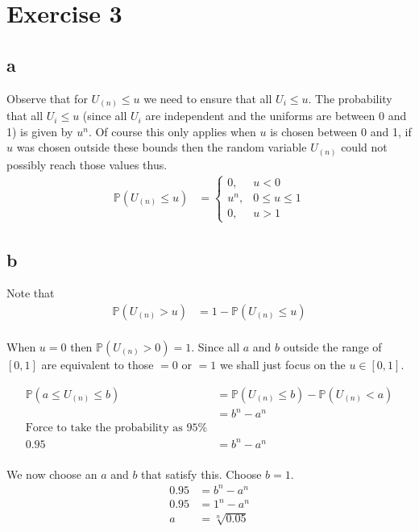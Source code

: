 \documentclass{article}
\newcommand{\prob}{\mathbb{P}}
\begin{document}
\section{Exercise 3}
\subsection{a}
Observe that for $U_{(n)} \leq u$ we need to ensure that all $U_i \leq u$.
The probability that all $U_i \leq u$ (since all $U_i$ are independent and the
uniforms are between 0 and 1) is given by $u^n$. Of course this only applies
when $u$ is chosen between 0 and 1, if $u$ was chosen outside these bounds then
the random variable $U_{(n)}$ could not possibly reach those values thus.
\begin{align*}
    \prob(U_{(n)} \leq u)
    &=
    \begin{cases}
        0, & u < 0 \\
        u^n, & 0 \leq u \leq 1 \\
        0, & u > 1
    \end{cases}
\end{align*}

\subsection{b}
Note that
\begin{align*}
    \prob(U_{(n)} > u) &= 1 - \prob(U_{(n)} \leq u) \\
\end{align*}

When $u = 0$ then $\prob(U_{(n)} > 0) = 1$. Since all $a$ and $b$ outside the
range of $[0,1]$ are equivalent to those $=0$ or $=1$ we shall just focus on the
$u \in [0,1]$.

\begin{align*}
    \prob(a \leq U_{(n)} \leq b) &= \prob(U_{(n)} \leq b) - \prob(U_{(n)} < a) \\
    &= b^n - a^n \\
    \text{Force to take the probability as 95\%} \\
    0.95 &= b^n - a^n \\
\end{align*}

We now choose an $a$ and $b$ that satisfy this. Choose $b=1$.
\begin{align*}
    0.95 &= b^n - a^n \\
    0.95 &= 1^n - a^n \\
    a &= \sqrt[n]{0.05} \\
\end{align*}
\end{document}
